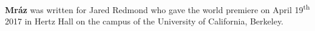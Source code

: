 \textbf{Mráz} was written for Jared Redmond who gave the world premiere on
April 19\textsuperscript{th} 2017 in Hertz Hall on the campus of the University
of California, Berkeley.
